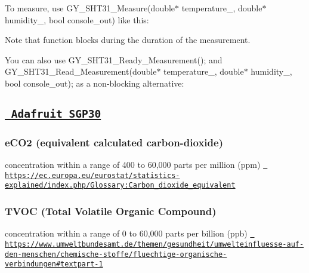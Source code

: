 To measure, use {\ttfamily G\+Y\+\_\+\+S\+H\+T31\+\_\+\+Measure(double$\ast$ temperature\+\_\+, double$\ast$ humidity\+\_\+, bool console\+\_\+out)} like this\+: 
\begin{DoxyCode}{0}
\DoxyCodeLine{}
\end{DoxyCode}


Note that function blocks during the duration of the measurement.

You can also use {\ttfamily G\+Y\+\_\+\+S\+H\+T31\+\_\+\+Ready\+\_\+\+Measurement();} and {\ttfamily G\+Y\+\_\+\+S\+H\+T31\+\_\+\+Read\+\_\+\+Measurement(double$\ast$ temperature\+\_\+, double$\ast$ humidity\+\_\+, bool console\+\_\+out);} as a non-\/blocking alternative\+: 
\begin{DoxyCode}{0}
\DoxyCodeLine{}
\end{DoxyCode}


\subsection*{\href{https://learn.adafruit.com/adafruit-sgp30-gas-tvoc-eco2-mox-sensor/}{\texttt{ Adafruit S\+G\+P30}}}

\subsubsection*{e\+C\+O2 (equivalent calculated carbon-\/dioxide)}

concentration within a range of 400 to 60,000 parts per million (ppm) \href{https://ec.europa.eu/eurostat/statistics-explained/index.php/Glossary:Carbon_dioxide_equivalent}{\texttt{ https\+://ec.\+europa.\+eu/eurostat/statistics-\/explained/index.\+php/\+Glossary\+:\+Carbon\+\_\+dioxide\+\_\+equivalent}}

\subsubsection*{T\+V\+OC (Total Volatile Organic Compound)}

concentration within a range of 0 to 60,000 parts per billion (ppb) \href{https://www.umweltbundesamt.de/themen/gesundheit/umwelteinfluesse-auf-den-menschen/chemische-stoffe/fluechtige-organische-verbindungen\#textpart-1}{\texttt{ https\+://www.\+umweltbundesamt.\+de/themen/gesundheit/umwelteinfluesse-\/auf-\/den-\/menschen/chemische-\/stoffe/fluechtige-\/organische-\/verbindungen\#textpart-\/1}} 